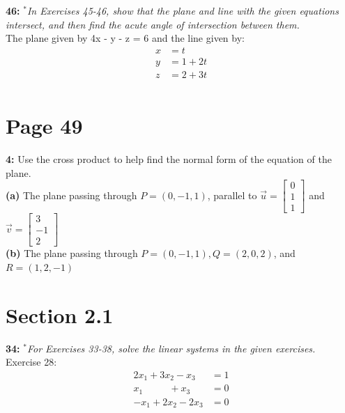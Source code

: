 \documentclass[12pt,letterpaper]{hmcpset}
\begin{document}

\pagebreak

\begin{problem}
\textbf{46:} \textit{$^*$In Exercises 45-46, show that the plane and line with the
given equations intersect, and then find the acute angle of
intersection between them.}\\
The plane given by 4x - y - z = 6 and the line
given by:
\begin{equation}
\begin{split}
 x &= t \\
y &= 1 + 2t\\
z &= 2 + 3t\\
\end{split}
\end{equation}
\end{problem}



\pagebreak
\section{Page 49}

\begin{problem}
\textbf{4:} Use the cross product to help find the normal form of the equation of the plane.\\
\textbf{(a)} The plane passing through $P = (0, -1, 1)$, parallel to $\vec{u} = \begin{bmatrix} 0 \\ 1 \\ 1 \end{bmatrix} $ and $ \vec{v} = \begin{bmatrix} 3 \\ -1 \\ 2 \end{bmatrix} $\\
\textbf{(b)} The plane passing through $P = (0, -1, 1), Q = (2, 0, 2)$, and $R = (1, 2, -1)$ 

\end{problem}



\pagebreak
\section{Section 2.1}

\begin{problem}
\textbf{34:}  \textit{$^*$For Exercises 33-38, solve the linear systems in the given
exercises.}\\
Exercise 28:
\begin{equation}
\begin{split}
2x_1 + 3x_2 - x_3 &= 1\\
x_1\  \ \qquad\ + x_3 &= 0 \\
-x_1 + 2x_2 - 2x_3 &= 0
\end{split}
\end{equation}

\end{problem}
\end{document}

